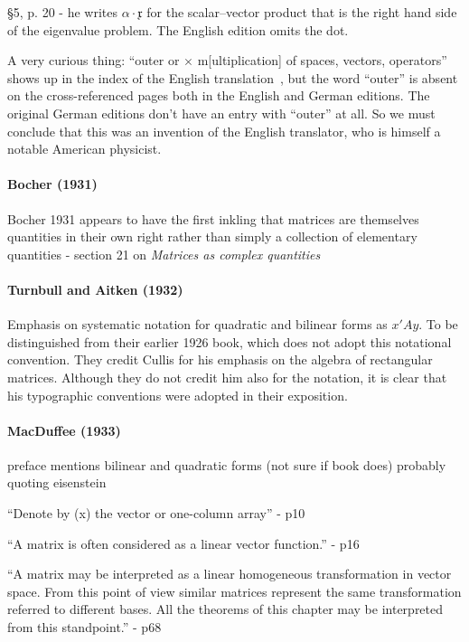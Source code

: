 \S 5, p. 20 - he writes $\alpha \cdot \mathfrak x$ for the scalar--vector product
that is the right hand side of the eigenvalue problem. The English edition omits the dot.

A very curious thing: ``outer or $\times$ m[ultiplication] of spaces, vectors,
operators'' shows up in the index of the English translation~\cite{Weyl1931},
but the word ``outer'' is absent on the cross-referenced pages both in the
English and German editions. The original German editions don't have an entry
with ``outer'' at all. So we must conclude that this was an invention of the
English translator, who is himself a notable American physicist.



\paragraph{Bocher (1931)}

Bocher 1931 appears to have the first inkling that matrices are themselves
quantities in their own right rather than simply a collection of elementary
quantities - section 21 on \textit{Matrices as complex quantities}



\paragraph{Turnbull and Aitken (1932)}

Emphasis on systematic notation for quadratic and bilinear forms as $x'Ay$.
To be distinguished from their earlier 1926 book, which does not adopt this notational convention.
They credit Cullis for his emphasis on the algebra of rectangular matrices. Although they do not credit him also for the notation, it is clear that his typographic conventions were adopted in their exposition.



\paragraph{MacDuffee (1933)~\cite{MacDuffee1933}}

preface mentions bilinear and quadratic forms (not sure if book does)
probably quoting eisenstein

``Denote by (x) the vector or one-column array'' - p10

``A matrix is often considered as a linear vector function.'' - p16

``A matrix may be interpreted as a linear homogeneous transformation in
vector space. From this point of view similar matrices represent the
same transformation referred to different bases. All the theorems of
this chapter may be interpreted from this standpoint.'' - p68

